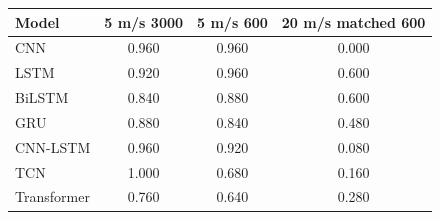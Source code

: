 \begin{tabular}{lccc}
\toprule
Model & 5 m/s 3000 & 5 m/s 600 & 20 m/s matched 600 \\
\midrule
CNN & 0.960 & 0.960 & 0.000 \\
LSTM & 0.920 & 0.960 & 0.600 \\
BiLSTM & 0.840 & 0.880 & 0.600 \\
GRU & 0.880 & 0.840 & 0.480 \\
CNN-LSTM & 0.960 & 0.920 & 0.080 \\
TCN & 1.000 & 0.680 & 0.160 \\
Transformer & 0.760 & 0.640 & 0.280 \\
\bottomrule
\end{tabular}
